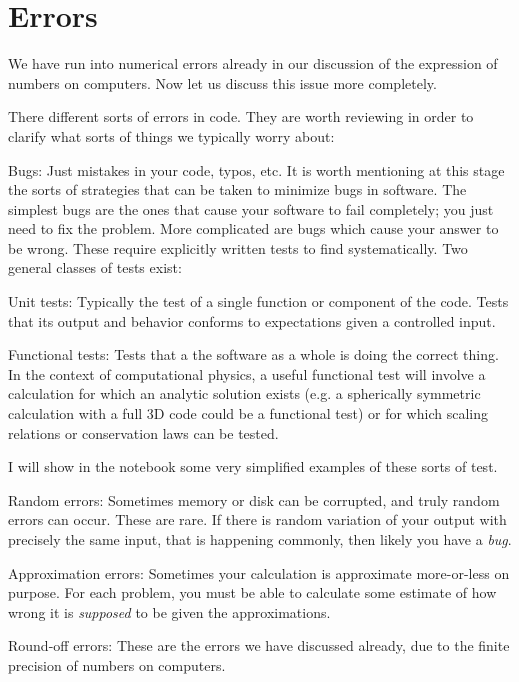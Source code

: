 \section{Errors}

We have run into numerical errors already in our discussion of the
expression of numbers on computers. Now let us discuss this issue more
completely. 

There different sorts of errors in code. They are worth reviewing in
order to clarify what sorts of things we typically worry about:
\begin{ditemize}
\item Bugs: Just mistakes in your code, typos, etc. It is worth
  mentioning at this stage the sorts of strategies that can be taken
  to minimize bugs in software. The simplest bugs are the ones that
  cause your software to fail completely; you just need to fix the
  problem. More complicated are bugs which cause your answer to be
  wrong. These require explicitly written tests to find
  systematically. Two general classes of tests  exist:
  \begin{ditemize}
    \item Unit tests: Typically the test of a single function or
      component of the code. Tests that its output and behavior
      conforms to expectations given a controlled input.
    \item Functional tests: Tests that a the software as a whole is
      doing the correct thing. In the context of computational
      physics, a useful functional test will involve a calculation for
      which an analytic solution exists (e.g. a spherically symmetric
      calculation with a full 3D code could be a functional test) or
      for which scaling relations or conservation laws can be tested.
  \end{ditemize}
  I will show in the notebook some very simplified examples of these
  sorts of test.
\item Random errors: Sometimes memory or disk can be corrupted, and
  truly random errors can occur. These are rare. If there is random
  variation of your output with precisely the same input, that is
  happening commonly, then likely you have a {\it bug}.
\item Approximation errors: Sometimes your calculation is approximate
  more-or-less on purpose. For each problem, you must be able to
  calculate some estimate of how wrong it is {\it supposed} to be
  given the approximations.
\item Round-off errors: These are the errors we have discussed
  already, due to the finite precision of numbers on computers. 
\end{ditemize}

